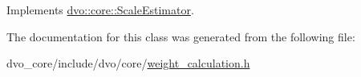 Implements \mbox{\hyperlink{classdvo_1_1core_1_1_scale_estimator_a6968ac2cd37c2ce1c966f0c9e17d1a3c}{dvo\+::core\+::\+Scale\+Estimator}}.



The documentation for this class was generated from the following file\+:\begin{DoxyCompactItemize}
\item 
dvo\+\_\+core/include/dvo/core/\mbox{\hyperlink{weight__calculation_8h}{weight\+\_\+calculation.\+h}}\end{DoxyCompactItemize}
